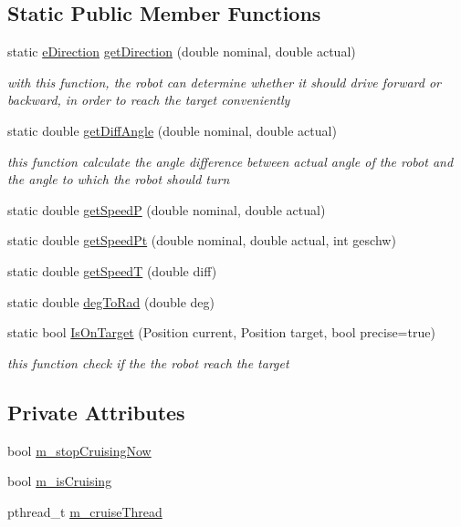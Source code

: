 \subsection*{Static Public Member Functions}
\begin{DoxyCompactItemize}
\item 
static \hyperlink{classNewRoboControl_a077fa253b827c190e82c1ce1e4c8d18f}{eDirection} \hyperlink{classNewRoboControl_a9979ccfbc622d9082fb034caf36c514b}{getDirection} (double nominal, double actual)
\begin{DoxyCompactList}\small\item\em with this function, the robot can determine whether it should drive forward or backward, in order to reach the target conveniently \item\end{DoxyCompactList}\item 
static double \hyperlink{classNewRoboControl_a960c714f4f8828d16dc955c871affbb5}{getDiffAngle} (double nominal, double actual)
\begin{DoxyCompactList}\small\item\em this function calculate the angle difference between actual angle of the robot and the angle to which the robot should turn \item\end{DoxyCompactList}\item 
static double \hyperlink{classNewRoboControl_ab2f2407b40c535ed734049e8e1ed71e6}{getSpeedP} (double nominal, double actual)
\item 
static double \hyperlink{classNewRoboControl_ac1f5cb8932193d5e8315bb19aeddb3fa}{getSpeedPt} (double nominal, double actual, int geschw)
\item 
static double \hyperlink{classNewRoboControl_a0c5f29bb2dee1faf96725b80ddc64398}{getSpeedT} (double diff)
\item 
static double \hyperlink{classNewRoboControl_a44def2cefef0f6c41b180bda044dfdfb}{degToRad} (double deg)
\item 
static bool \hyperlink{classNewRoboControl_a106c7ccc03f05693a07da1235ab0b17f}{IsOnTarget} (Position current, Position target, bool precise=true)
\begin{DoxyCompactList}\small\item\em this function check if the the robot reach the target \item\end{DoxyCompactList}\end{DoxyCompactItemize}
\subsection*{Private Attributes}
\begin{DoxyCompactItemize}
\item 
bool \hyperlink{classNewRoboControl_a2f7afe3fa8d85f8fedf05ba12ec21f32}{m\_\-stopCruisingNow}
\item 
bool \hyperlink{classNewRoboControl_aa83c55c4b75ef04c909038e2ad581e3b}{m\_\-isCruising}
\item 
pthread\_\-t \hyperlink{classNewRoboControl_a285a033aa3238a589d78243ce7cdb620}{m\_\-cruiseThread}
\end{DoxyCompactItemize}


